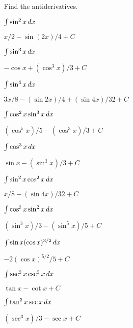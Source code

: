 \begin{exercises}

Find the antiderivatives.

\twocol

\begin{exercise} $\int \sin^2 x\, d x$
\begin{answer} $x/2-\sin(2x)/4+C$
\end{answer}\end{exercise}

\begin{exercise} $\int \sin^3 x\, d x$
\begin{answer} $-\cos x+(\cos^3x)/3+C$
\end{answer}\end{exercise}

\begin{exercise} $\int \sin^4 x\, d x$
\begin{answer} $3x/8-(\sin 2x)/4+(\sin 4x)/32+C$
\end{answer}\end{exercise}

\begin{exercise} $\int \cos^2 x\sin^3 x\, d x$
\begin{answer} $(\cos^5 x)/5-(\cos^3x)/3+C$
\end{answer}\end{exercise}

\begin{exercise} $\int \cos^3 x\, d x$
\begin{answer} $\sin x-(\sin^3x)/3+C$
\end{answer}\end{exercise}

\begin{exercise} $\int \sin^2 x\cos^2 x\, d x$
\begin{answer} $x/8-(\sin 4x)/32+C$
\end{answer}\end{exercise}

\begin{exercise} $\int \cos^3 x \sin^2 x\, d x$
\begin{answer} $(\sin^3x)/3-(\sin^5x)/5+C$
\end{answer}\end{exercise}

\begin{exercise} $\int \sin x (\cos x)^{3/2}\, d x$
\begin{answer} $-2(\cos x)^{5/2}/5+C$
\end{answer}\end{exercise}

\begin{exercise} $\int \sec^2 x\csc^2 x\, d x$
\begin{answer} $\tan x-\cot x+C$
\end{answer}\end{exercise}

\begin{exercise} $\int \tan^3x \sec x\, d x$
\begin{answer} $(\sec^3x)/3-\sec x+C$
\end{answer}\end{exercise}

\endtwocol

\end{exercises}

